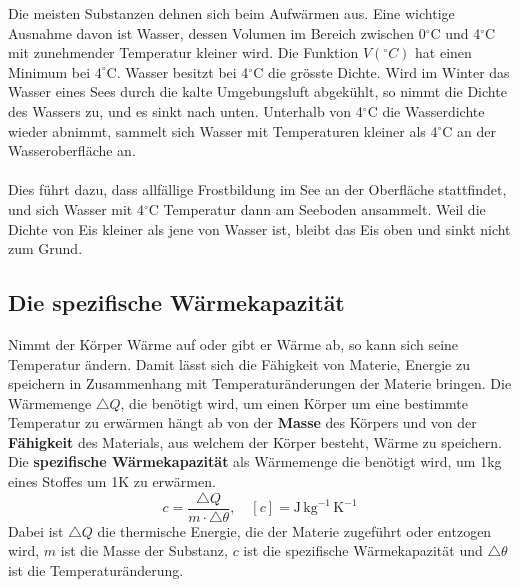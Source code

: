 Die meisten Substanzen dehnen sich beim Aufwärmen aus. Eine wichtige Ausnahme davon ist Wasser, dessen Volumen im Bereich zwischen 0$^{\circ}$C und 4$^{\circ}$C mit zunehmender Temperatur kleiner wird. Die Funktion $V\left(^{\circ}C\right)$ hat einen Minimum bei $4^{\circ}$C. Wasser besitzt bei 4$^{\circ}$C die grösste Dichte. Wird im Winter das Wasser eines Sees durch die kalte Umgebungsluft abgekühlt, so nimmt die Dichte des Wassers zu, und es sinkt nach unten. Unterhalb von 4$^\circ$C die Wasserdichte wieder abnimmt, sammelt sich Wasser mit Temperaturen kleiner als 4$^\circ$C an der Wasseroberfläche an.
\\\\
Dies führt dazu, dass allfällige Frostbildung im See an der Oberfläche stattfindet, und sich Wasser mit 4$^\circ$C Temperatur dann am Seeboden ansammelt. Weil die Dichte von Eis kleiner als jene von Wasser ist, bleibt das Eis oben und sinkt nicht zum Grund.
\subsection{Die spezifische Wärmekapazität}
Nimmt der Körper Wärme auf oder gibt er Wärme ab, so kann sich seine Temperatur ändern. Damit lässt sich die Fähigkeit von Materie, Energie zu speichern in Zusammenhang mit Temperaturänderungen der Materie bringen. Die Wärmemenge $\triangle Q$, die benötigt wird, um einen Körper um eine bestimmte Temperatur zu erwärmen hängt ab von der \textbf{Masse} des Körpers und von der \textbf{Fähigkeit} des Materials, aus welchem der Körper besteht, Wärme zu speichern. Die \textbf{spezifische Wärmekapazität} als Wärmemenge die benötigt wird, um 1kg eines Stoffes um 1K zu erwärmen.
\begin{equation}
\boxed{c=\dfrac{\triangle Q}{m\cdot \triangle \theta},\quad [c]=\text{J}\,\text{kg}^{-1}\,\text{K}^{-1}}
\end{equation}
Dabei ist $\triangle Q$ die thermische Energie, die der Materie zugeführt oder entzogen wird, $m$ ist die Masse der Substanz, $c$ ist die spezifische Wärmekapazität und $\triangle \theta$ ist die Temperaturänderung.
